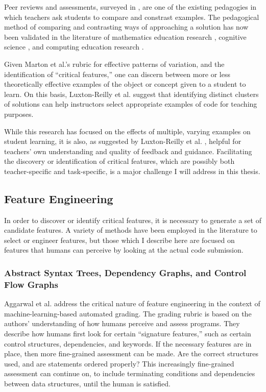 Peer reviews and assessments, surveyed in \cite{peerReview98}, are one of the existing pedagogies in which teachers ask students to compare and constrast examples. The pedagogical method of comparing and contrasting ways of approaching a solution has now been validated in the literature of mathematics education research \cite{Star07}, cognitive science \cite{loewenstein2003analogical,kurtz01learning,telling}, and computing education research \cite{Suhonen08, PatitsasICER13}.

Given Marton et al.'s rubric for effective patterns of variation, and the identification of ``critical features,'' one can discern between more or less theoretically effective examples of the object or concept given to a student to learn. On this basis, Luxton-Reilly et al. \cite{Luxton13} suggest that identifying distinct clusters of solutions can help instructors select appropriate examples of code for teaching purposes. 

While this research has focused on the effects of multiple, varying examples on student learning, it is also, as suggested by Luxton-Reilly et al. \cite{Luxton13}, helpful for teachers' own understanding and quality of feedback and guidance. Facilitating the discovery or identification of critical features, which are possibly both teacher-specific and task-specific, is a major challenge I will address in this thesis.

\subsection{Feature Engineering}

In order to discover or identify critical features, it is necessary to generate a set of candidate features. A variety of methods have been employed in the literature to select or engineer features, but those which I describe here are focused on features that humans can perceive by looking at the actual code submission.

\subsubsection{Abstract Syntax Trees, Dependency Graphs, and Control Flow Graphs}

Aggarwal et al. \cite{aggarwalprinciples} address the critical nature of feature engineering in the context of machine-learning-based automated grading. The grading rubric is based on the authors' understanding of how humans perceive and assess programs. They describe how humans first look for certain ``signature features,'' such as certain control structures, dependencies, and keywords. If the necessary features are in place, then more fine-grained assessment can be made. Are the correct structures used, and are statements ordered properly? This increasingly fine-grained assessment can continue on, to include terminating conditions and dependencies between data structures, until the human is satisfied. 

